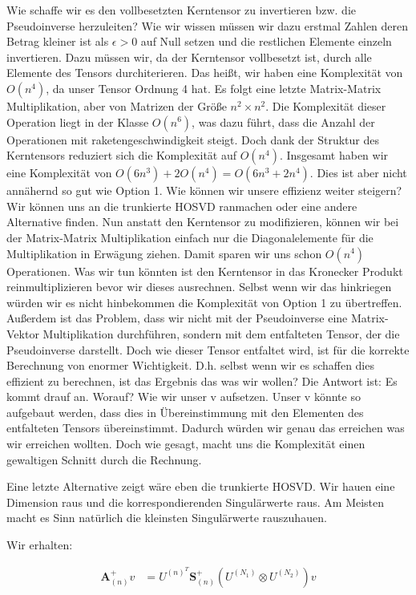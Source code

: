 Wie schaffe wir es den vollbesetzten Kerntensor zu invertieren bzw. die Pseudoinverse herzuleiten? Wie wir wissen müssen wir dazu erstmal Zahlen deren Betrag kleiner ist als $\epsilon > 0$ auf Null setzen und die restlichen Elemente einzeln invertieren. 
Dazu müssen wir, da der Kerntensor vollbesetzt ist, durch alle Elemente des Tensors durchiterieren. Das heißt, wir haben eine Komplexität von $O(n^4)$, da unser Tensor Ordnung 4 hat.
Es folgt eine letzte Matrix-Matrix Multiplikation, aber von Matrizen der Größe $n^2 \times n^2$. Die Komplexität dieser Operation liegt in der Klasse $O(n^6)$, was dazu führt, dass die Anzahl der Operationen mit raketengeschwindigkeit steigt. Doch dank der Struktur des Kerntensors reduziert sich die Komplexität auf $O(n^4)$.  
Insgesamt haben wir eine Komplexität von $O(6n^3)+2O(n^4)=O(6n^3+2n^4)$. Dies ist aber nicht annähernd so gut wie Option 1. Wie können wir unsere effizienz weiter steigern?
Wir können uns an die trunkierte HOSVD ranmachen oder eine andere Alternative finden.
Nun anstatt den Kerntensor zu modifizieren, können wir bei der Matrix-Matrix Multiplikation einfach nur die Diagonalelemente für die Multiplikation in Erwägung ziehen. Damit sparen wir uns schon $O(n^4)$ Operationen. Was wir tun könnten ist den Kerntensor in das Kronecker Produkt reinmultiplizieren bevor wir dieses ausrechnen. Selbst wenn wir das hinkriegen würden wir es nicht hinbekommen die Komplexität von Option 1 zu übertreffen. Außerdem ist das Problem, dass wir nicht mit der Pseudoinverse eine Matrix-Vektor Multiplikation durchführen, sondern mit dem entfalteten Tensor, der die Pseudoinverse darstellt. Doch wie dieser Tensor entfaltet wird, ist für die korrekte Berechnung von enormer Wichtigkeit.
D.h. selbst wenn wir es schaffen dies effizient zu berechnen, ist das Ergebnis das was wir wollen?
Die Antwort ist: Es kommt drauf an. Worauf? Wie wir unser v aufsetzen. Unser v könnte so aufgebaut werden, dass dies in Übereinstimmung mit den Elementen des entfalteten Tensors übereinstimmt. Dadurch würden wir genau das erreichen was wir erreichen wollten. Doch wie gesagt, macht uns die Komplexität einen gewaltigen Schnitt durch die Rechnung.

Eine letzte Alternative zeigt wäre eben die trunkierte HOSVD.
Wir hauen eine Dimension raus und die korrespondierenden Singulärwerte raus. Am Meisten macht es Sinn natürlich die kleinsten Singulärwerte rauszuhauen. 

Wir erhalten:

\begin{equation}
\begin{aligned}
\mathscr{\textbf{A}}^{+}_{(n)}v&= U^{ (n) ^{T} }  \mathscr{\textbf{S}}^{+}_{(n)} ( U^{ (N_{1})  } \otimes U^{ (N_{2})} ) v
\end{aligned}
\end{equation}

